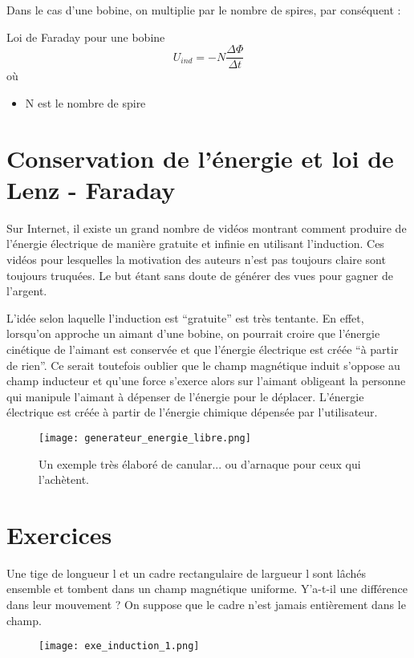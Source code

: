 Dans le cas d'une bobine, on multiplie par le nombre de spires, par conséquent :
\begin{encadre_equation*}{Loi de Faraday pour une bobine}
    \begin{equation}
        U_{ind}=-N \frac{\Delta \Phi}{\Delta t}
    \end{equation} où
    \begin{itemize}[label=\textbullet]
        \item N est le nombre de spire
    \end{itemize}
\end{encadre_equation*}

\newpage

\section{Conservation de l'énergie et loi de Lenz - Faraday}
Sur Internet, il existe un grand nombre de vidéos montrant comment produire de l'énergie électrique de manière gratuite et infinie en utilisant l'induction. Ces vidéos pour lesquelles la motivation des auteurs n'est pas toujours claire sont toujours truquées. Le but étant sans doute de générer des vues pour gagner de l'argent.

L'idée selon laquelle l'induction est \enquote{gratuite} est très tentante. En effet, lorsqu'on approche un aimant d'une bobine, on pourrait croire que l'énergie cinétique de l'aimant est conservée et que l'énergie électrique est créée \enquote{à partir de rien}. Ce serait toutefois oublier que le champ magnétique induit s'oppose au champ inducteur et qu'une force s'exerce alors sur l'aimant obligeant la personne qui manipule l'aimant à dépenser de l'énergie pour le déplacer. L'énergie électrique est créée à partir de l'énergie chimique dépensée par l'utilisateur.

\begin{figure}[ht]
    \centering
    \texttt{[image: generateur\_energie\_libre.png]}
    \caption{Un exemple très élaboré de canular... ou d'arnaque pour ceux qui l'achètent.}
    \label{generateur_energie_libre}
\end{figure}

\newpage

\section{Exercices}
\begin{exercise}
    Une tige de longueur l et un cadre rectangulaire de largueur l sont lâchés ensemble et tombent dans un champ magnétique uniforme. Y'a-t-il une différence dans leur mouvement ? On suppose que le cadre n'est jamais entièrement dans le champ.
    \begin{figure}[h!]
        \centering
        \texttt{[image: exe\_induction\_1.png]}
        \label{loi_faraday_1}
    \end{figure}
\end{exercise}

